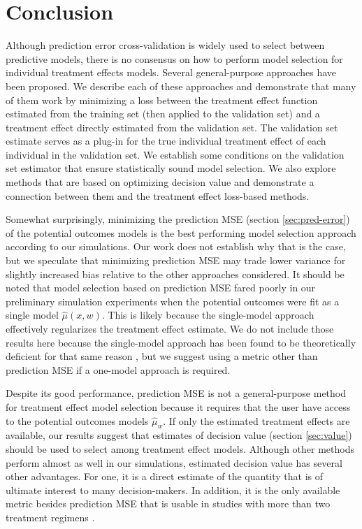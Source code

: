 \section{Conclusion}
\label{conclusion}

Although prediction error cross-validation is widely used to select between predictive models, there is no consensus on how to perform model selection for individual treatment effects models. Several general-purpose approaches have been proposed. We describe each of these approaches and demonstrate that many of them work by minimizing a loss between the treatment effect function estimated from the training set (then applied to the validation set) and a treatment effect directly estimated from the validation set. The validation set estimate serves as a plug-in for the true individual treatment effect of each individual in the validation set. We establish some conditions on the validation set estimator that ensure statistically sound model selection. We also explore methods that are based on optimizing decision value and demonstrate a connection between them and the treatment effect loss-based methods. 

Somewhat surprisingly, minimizing the prediction MSE (section \ref{sec:pred-error}) of the potential outcomes models is the best performing model selection approach according to our simulations. Our work does not establish why that is the case, but we speculate that minimizing prediction MSE may trade lower variance for slightly increased bias relative to the other approaches considered. It should be noted that model selection based on prediction MSE fared poorly in our preliminary simulation experiments when the potential outcomes were fit as a single model $\hat\mu(x,w)$. This is likely because the single-model approach effectively regularizes the treatment effect estimate. We do not include those results here because the single-model approach has been found to be theoretically deficient for that same reason \cite{Alaa:tj}, but we suggest using a metric other than prediction MSE if a one-model approach is required. 

Despite its good performance, prediction MSE is not a general-purpose method for treatment effect model selection because it requires that the user have access to the potential outcomes models $\hat\mu_w$. If only the estimated treatment effects are available, our results suggest that estimates of decision value (section \ref{sec:value}) should be used to select among treatment effect models. Although other methods perform almost as well in our simulations, estimated decision value has several other advantages. For one, it is a direct estimate of the quantity that is of ultimate interest to many decision-makers. In addition, it is the only available metric besides prediction MSE that is usable in studies with more than two treatment regimens \cite{Zhao:2017vi}. 

